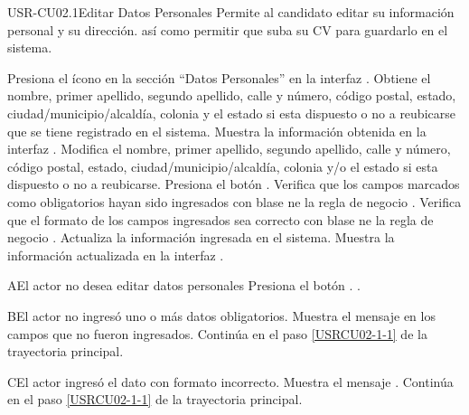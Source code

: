 \begin{UseCase}[]{USR-CU02.1}{Editar Datos Personales}{
	Permite al candidato editar su información personal y su dirección. así como permitir que suba su CV para guardarlo en el sistema.
}
\end{UseCase}

\begin{UCtrayectoria}
	\UCpaso [\UCactor] Presiona el ícono \IUEditar{} en la sección ``Datos Personales'' en la interfaz . 
	\UCpaso Obtiene el nombre, primer apellido, segundo apellido, calle y número, código postal, estado, ciudad/municipio/alcaldía, colonia y el estado si esta dispuesto o no a reubicarse que se tiene registrado en el sistema.
	\UCpaso [\UCsist] Muestra la información obtenida en la interfaz .
	\UCpaso \label{USRCU02-1-1} Modifica el nombre, primer apellido, segundo apellido, calle y número, código postal, estado, ciudad/municipio/alcaldía, colonia y/o el estado si esta dispuesto o no a reubicarse.
	\UCpaso [\UCsist] Presiona el botón .
	\UCpaso Verifica que los campos marcados como obligatorios hayan sido ingresados con blase ne la regla de negocio .
	\UCpaso Verifica que el formato de los campos ingresados sea correcto con blase ne la regla de negocio .
	\UCpaso Actualiza la información ingresada en el sistema.
	\UCpaso Muestra la información actualizada en la interfaz . 
\end{UCtrayectoria}

\begin{UCtrayectoriaA}{A}{El actor no desea editar datos personales}
	\UCpaso [\UCsist] Presiona el botón .
	.
\end{UCtrayectoriaA} 

\begin{UCtrayectoriaA}{B}{El actor no ingresó uno o más datos obligatorios.}
	\UCpaso [\UCsist] Muestra el mensaje  en los campos que no fueron ingresados.
	\UCpaso [\UCsist] Continúa en el paso \ref{USRCU02-1-1} de la trayectoria principal.
\end{UCtrayectoriaA} 

\begin{UCtrayectoriaA}{C}{El actor ingresó el dato con formato incorrecto.}
	\UCpaso [\UCsist] Muestra el mensaje .
	\UCpaso [\UCsist] Continúa en el paso \ref{USRCU02-1-1} de la trayectoria principal.
\end{UCtrayectoriaA}



